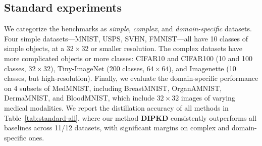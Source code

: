 \subsection{Standard experiments} \label{sec:44-research02-experiments-standard}
\begin{foldable} %
  We categorize the benchmarks as \textit{simple}, \textit{complex}, and \textit{domain-specific} datasets.
  Four simple datasets---MNIST, USPS, SVHN, FMNIST---all have 10 classes of simple objects, at a $32\times32$ or smaller resolution.
  The complex datasets have more complicated objects or more classes: CIFAR10 and CIFAR100 (10 and 100 classes, $32\times32$), Tiny-ImageNet (200 classes, $64\times64$), and Imagenette (10 classes, but high-resolution).
  Finally, we evaluate the domain-specific performance on 4 subsets of MedMNIST, including BreastMNIST, OrganAMNIST, DermaMNIST, and BloodMNIST, which include $32\times32$ images of varying medical modalities.
  We report the distillation accuracy of all methods in Table~\ref{tab:standard-all}, where our method \textbf{\ac{DIPKD}} consistently outperforms all baselines across 11/12 datasets, with significant margins on complex and domain-specific ones.
\end{foldable}

